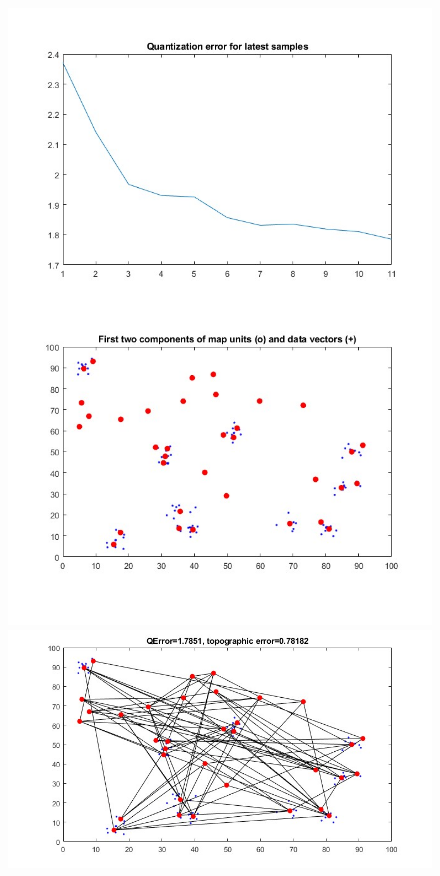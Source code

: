 \documentclass[11pt]{article}
\begin{document}
\begin{figure}[h!]
  \includegraphics{screeny/NeuralGas/Neural_gasp_10_groups/Neural_gasp_learning_process.jpg}
  \includegraphics{screeny/NeuralGas/Neural_gasp_10_groups/Neural_gasp_Graph.jpg}

\end{figure}
\end{document}

